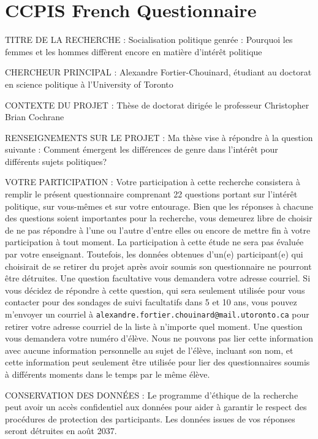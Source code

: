 \documentclass[
  letterpaper,
  DIV=11,
  numbers=noendperiod]{scrreprt}
\begin{document}
\hypertarget{sec-appendix2}{%
\chapter{CCPIS French Questionnaire}\label{sec-appendix2}}

TITRE DE LA RECHERCHE : Socialisation politique genrée : Pourquoi les
femmes et les hommes diffèrent encore en matière d'intérêt politique

CHERCHEUR PRINCIPAL : Alexandre Fortier-Chouinard, étudiant au doctorat
en science politique à l'University of Toronto

CONTEXTE DU PROJET : Thèse de doctorat dirigée le professeur Christopher
Brian Cochrane

RENSEIGNEMENTS SUR LE PROJET : Ma thèse vise à répondre à la question
suivante : Comment émergent les différences de genre dans l'intérêt pour
différents sujets politiques?

VOTRE PARTICIPATION : Votre participation à cette recherche consistera à
remplir le présent questionnaire comprenant 22 questions portant sur
l'intérêt politique, sur vous-mêmes et sur votre entourage. Bien que les
réponses à chacune des questions soient importantes pour la recherche,
vous demeurez libre de choisir de ne pas répondre à l'une ou l'autre
d'entre elles ou encore de mettre fin à votre participation à tout
moment. La participation à cette étude ne sera pas évaluée par votre
enseignant. Toutefois, les données obtenues d'un(e) participant(e) qui
choisirait de se retirer du projet après avoir soumis son questionnaire
ne pourront être détruites. Une question facultative vous demandera
votre adresse courriel. Si vous décidez de répondre à cette question,
qui sera seulement utilisée pour vous contacter pour des sondages de
suivi facultatifs dans 5 et 10 ans, vous pouvez m'envoyer un courriel à
\texttt{alexandre.fortier.chouinard@mail.utoronto.ca} pour retirer votre
adresse courriel de la liste à n'importe quel moment. Une question vous
demandera votre numéro d'élève. Nous ne pouvons pas lier cette
information avec aucune information personnelle au sujet de l'élève,
incluant son nom, et cette information peut seulement être utilisée pour
lier des questionnaires soumis à différents moments dans le temps par le
même élève.

CONSERVATION DES DONNÉES : Le programme d'éthique de la recherche peut
avoir un accès confidentiel aux données pour aider à garantir le respect
des procédures de protection des participants. Les données issues de vos
réponses seront détruites en août 2037.
\end{document}
